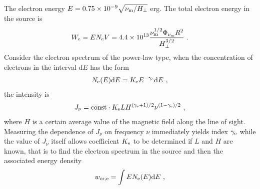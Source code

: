 \documentclass[12pt,a4paper]{article}
\newcommand{\dif}{\mathrm{d}}
\begin{document}
The electron energy $E = 0.75 \times 10^{-9} \sqrt{\nu_{\rm m} /H_\perp}$ erg. The total electron energy in the source is
\begin{align}
W_{\rm e} = EN_{\rm e} V = 4.4 \times 10^{13} \dfrac{\nu_{\rm m}^{1/2} \Phi_{\nu_{\rm m}} R^2}{H_\perp^{3/2}} ~.
\end{align}
Consider the electron spectrum of the power-law type, when the concentration of electrons in the interval $\dif E$ has the form
\begin{align}
N_{\rm e}(E) \dif E = K_{\rm e} E^{-\gamma_{\rm e}} \dif E ~,
\end{align}
the intensity is
\begin{align}
J_{\nu} = {\rm const} \cdot K_{\rm e} LH^{(\gamma_{\rm e}+1)/2} \nu^{(1-\gamma_{\rm e})/2} ~,
\end{align}
where $H$ is a certain average value of the magnetic field along the line of sight. Measuring the dependence of $J_{\nu}$ on frequency $\nu$ immediately yields index $\gamma_{\rm e}$ while the value of $J_{\nu}$ itself allows coefficient $K_{\rm e}$ to be determined if $L$ and $H$ are known, that is to find the electron spectrum in the source and then the associated energy density
\begin{align}
w_{\rm cr, e} = \int  E N_{\rm e}(E) \dif E ~,
\end{align}
















\end{document}
